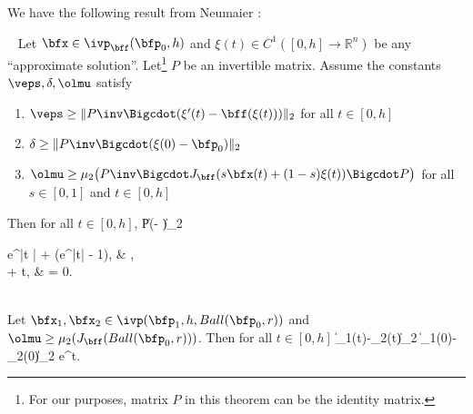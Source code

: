 	We have the following result from Neumaier
	\citep[Corollary 4.5]{neumaier:rigorous-bds:93}:

	 \
		Let $\bfx\in \ivp_\bff(\bfp_0,h)$
		and $\xi(t)\in C^1([0,h]\to \mathbb{R}^n)$
		be any ``approximate solution''. Let\footnote{
			For our purposes, matrix $P$ in this theorem can be the
			identity matrix.
		}
		$P$ be an invertible matrix.
		Assume the constants $\veps,\delta,\olmu$ satisfy

		\begin{enumerate}
			\item 
				$\veps \ge
					\|P\inv\Bigcdot(\xi'(t) - \bff(\xi(t)))\|_2$
				for all $t \in [0, h]$ 
			\item
				$\delta \ge 
					\|P\inv\Bigcdot(\xi(0)-\bfp_0)\|_2 $
			\item 
				$\olmu \ge
					\mu_2  \big(P\inv\Bigcdot J_{\bff}(s\bfx(t) +
					(1-s)\xi(t))\Bigcdot P\big)$
				for all $s \in [0,1]$ and $t \in [0, h]$
		\end{enumerate} 
		Then for all $t \in [0, h]$,
			\|P\inv\Bigcdot(\xi - \bfx)\|_2 \le
				\begin{cases}
			\delta e^{\olmu|t |} + \frac{\veps}{\olmu}(e^{\olmu|t|} - 1),
					& \olmu {}, \\
			\delta + \veps t, & \olmu = 0.
				\end{cases}
		\eeql
	\ethmT
	
	\bcorl[cor-1] \ \\
		Let $\bfx_1,\bfx_2 \in \ivp(\bfp_1,h,Ball(\bfp_0,r))$ and
		$\olmu\ge \mu_2(J_\bff(Ball(\bfp_0,r)))$.
		 Then for all $t\in [0,h]$
		  	\|\bfx_1(t)-\bfx_2(t)\|_2
		  		\le \|\bfx_1(0)-\bfx_2(0)\|_2 e^{\olmu t}.\eeql 
	\ecorl

